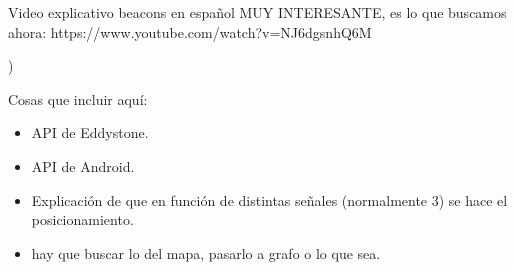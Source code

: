 Video explicativo beacons en español MUY INTERESANTE, es lo que buscamos ahora: https://www.youtube.com/watch?v=NJ6dgsnhQ6M

)

Cosas que incluir aquí:

\begin{itemize}
	\item API de Eddystone.
	\item API de Android.
	\item Explicación de que en función de distintas señales (normalmente 3) se hace el posicionamiento.
	\item hay que buscar lo del mapa, pasarlo a grafo o lo que sea.
\end{itemize}


 